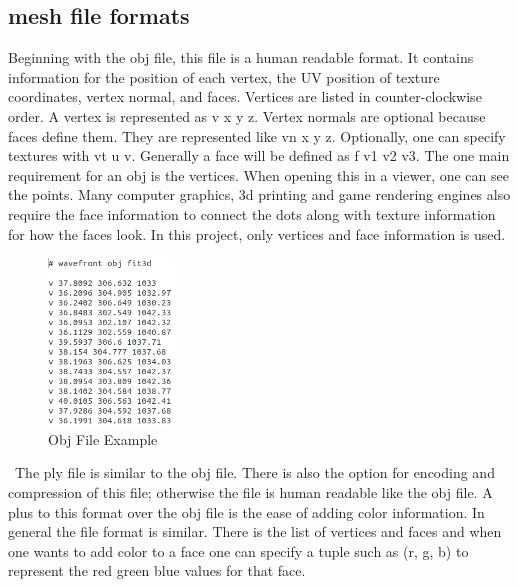 \subsection{mesh file formats}
Beginning with the obj file, this file is a human readable format. It contains information for the position of each vertex, the UV position of texture coordinates, vertex normal, and faces. Vertices are listed in counter-clockwise order. A vertex is represented as v x y z. Vertex normals are optional because faces define them. They are represented like vn x y z. Optionally, one can specify textures with vt u v. Generally a face will be defined as f v1 v2 v3. The one main requirement for an obj is the vertices. When opening this in a viewer, one can see the points. Many computer graphics, 3d printing and game rendering engines also require the face information to connect the dots along with texture information for how the faces look. In this project, only vertices and face information is used.
\begin{figure}[h]
	\caption{Obj File Example}
	\centering
	\includegraphics[width=0.3\textwidth]{images/obj_file.png}
\end{figure}
\
The ply file is similar to the obj file. There is also the option for encoding and compression of this file; otherwise the file is human readable like the obj file. A plus to this format over the obj file is the ease of adding color information. In general the file format is similar. There is the list of vertices and faces and when one wants to add color to a face one can specify a tuple such as (r, g, b) to represent the red green blue values for that face. 

